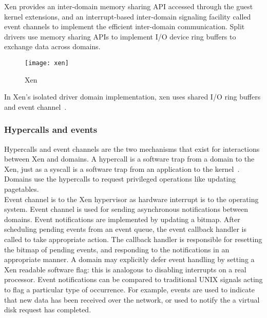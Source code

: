 Xen provides an inter-domain memory sharing API accessed through the guest kernel extensions, and an interrupt-based inter-domain signaling facility called event channels to implement the efficient inter-domain communication. Split drivers use memory sharing APIs to implement I/O device ring buffers to exchange data across domains.
\begin{figure}[!h]
\centering
\texttt{[image: xen]}
\caption{Xen}
\label{xen}
\end{figure}
In Xen's isolated driver domain implementation, xen uses shared I/O ring buffers and event channel~\cite{Barham:2003:XAV:1165389.945462, Nikolaev:2013:VOS:2517349.2522719, Ruslan}.

\subsubsection*{Hypercalls and events}
Hypercalls and event channels are the two mechanisms that exist for interactions between Xen and domains. A hypercall is a software trap from a domain to the Xen, just as a syscall is a software trap from an application to the kernel~\cite{hypercall}. Domains use the hypercalls to request privileged operations like updating pagetables. 
\\[3mm]
Event channel is to the Xen hypervisor as hardware interrupt is to the operating system. Event channel is used for sending asynchronous notifications between domains. Event notifications are implemented by updating a bitmap. After scheduling pending events from an event queue, the event callback handler is called to take appropriate action. The callback handler is responsible for resetting the bitmap of pending events, and responding to the notifications in an appropriate manner. A domain may explicitly defer event handling by setting a Xen readable software flag: this is analogous to disabling interrupts on a real processor. Event notifications can be compared to traditional UNIX signals acting to flag a particular type of occurrence. For example, events are used to indicate that new data has been received over the network, or used to notify the a virtual disk request has completed. 

